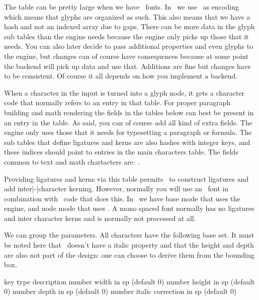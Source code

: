 {The  table can be pretty large when we have \OPENTYPE\ fonts.
In \CONTEXT\ we use \UNICODE\ as encoding which means that glyphs are organized
as such. This also means that we have a hash and not an indexed array due to
gaps. There can be more data in the glyph sub tables than the engine needs
because the engine only picks up those that it needs. You can also later decide
to pass additional properties and even glyphs to the engine, but changes can of
course have consequences because at some point the backend will pick up data and
use that. Additions are fine but changes have to be consistent. Of course it all
depends on how you implement a backend.

When a character in the input is turned into a glyph node, it gets a character
code that normally refers to an entry in that table. For proper paragraph
building and math rendering the fields in the tables below can best be present in
an entry in the  table. As said, you can of course add all kind
of extra fields. The engine only uses those that it needs for typesetting a
paragraph or formula. The sub tables that define ligatures and kerns are also
hashes with integer keys, and these indices should point to entries in the main
characters table. The fields common to text and math chartacters are:
.

Providing ligatures and kerns via this table permits \TEX\ to construct ligatures
and add inter|-|character kerning. However, normally you will use an \OPENTYPE\
font in combination with \LUA\ code that does this. In \CONTEXT\ we have base
mode that uses the engine, and node mode that uses \LUA. A mono spaced font
normally has no ligatures and inter character kerns and is normally not processed
at all.

We can group the parameters. All characters have the following base set. It must
be noted here that \OPENTYPE\ doesn't have a italic property and that the height
and depth are also not part of the design: one can choose to derive them from the
bounding box.

\starttabulate[|l|l|pl|]
\FL
\BC key            \BC type   \BC description                         \NC \NR
\ML
\NC {}  \NC number \NC width in sp (default 0)             \NC \NR
\NC \type {height} \NC number \NC height in sp (default 0)            \NC \NR
\NC \type {depth}  \NC number \NC depth in sp (default 0)             \NC \NR
\NC \type {italic} \NC number \NC italic correction in sp (default 0) \NC \NR
\LL
\stoptabulate

}
